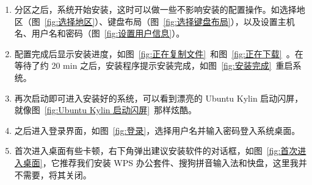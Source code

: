 \documentclass[cs4size,a4paper,nofonts]{ctexart}
\begin{document}
\begin{enumerate}
\begin{figure}[htp]
\end{figure}

\begin{figure}[htp]
\end{figure}

\item 分区之后，系统开始安装，这时可以做一些不影响安装的配置操作。如选择地区（图~\ref{fig:选择地区}）、键盘布局（图~\ref{fig:选择键盘布局}），以及设置主机名、用户名和密码（图~\ref{fig:设置用户信息}）。

\begin{figure}[htp]
\end{figure}

\begin{figure}[htp]
\end{figure}

\item 配置完成后显示安装进度，如图~\ref{fig:正在复制文件}~和图~\ref{fig:正在下载}~。在等待了约 20 min 之后，安装程序提示安装完成，如图~\ref{fig:安装完成}~重启系统。

\begin{figure}[htp]
\end{figure}

\item 再次启动即可进入安装好的系统，可以看到漂亮的 Ubuntu Kylin 启动闪屏，就像图~\ref{fig:Ubuntu Kylin 启动闪屏}~那样炫酷。

\item 之后进入登录界面，如图~\ref{fig:登录}，选择用户名并输入密码登入系统桌面。

\begin{figure}[htp]
\end{figure}

\clearpage

\item 首次进入桌面有些卡顿，右下角弹出建议安装软件的对话框，如图~\ref{fig:首次进入桌面}，它推荐我们安装 WPS 办公套件、搜狗拼音输入法和快盘，这里我并不需要，将其关闭。


\end{enumerate}
\end{document}
